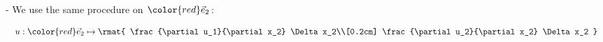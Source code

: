 \begin{frame}{\subsubsecname}



\pause

- We use the same procedure on ${\color{red}\vec e_2}$:

\begin{equation}
u: {\color{red}\vec e_2} \mapsto 
\rmat{
\frac{\partial u_1}{\partial x_2} \Delta x_2\\[0.2cm]
\frac{\partial u_2}{\partial x_2} \Delta x_2
}
\end{equation}

\end{frame}

